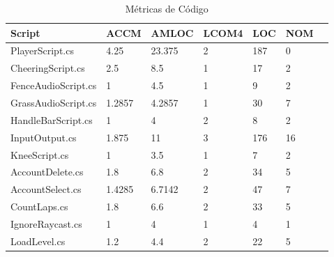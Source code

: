 \begin{table}[htp]
\centering
\caption{Métricas de Código}
\label{figura:metricas}
\begin{tabular}{lllllll}
\hline
Script & ACCM & AMLOC & LCOM4 & LOC & NOM \\
\hline
PlayerScript.cs & 4.25\cellcolor[HTML]{9AFF99} & 23.375\cellcolor[HTML]{FFCE93} & 2\cellcolor[HTML]{FFFC9E} & 187\cellcolor[HTML]{FFCE93} & 0\cellcolor[HTML]{9AFF99} \\
CheeringScript.cs & 2.5\cellcolor[HTML]{9AFF99} & 8.5\cellcolor[HTML]{9AFF99} & 1\cellcolor[HTML]{9AFF99} & 17\cellcolor[HTML]{9AFF99} & 2\cellcolor[HTML]{9AFF99} \\
FenceAudioScript.cs & 1\cellcolor[HTML]{9AFF99} & 4.5\cellcolor[HTML]{9AFF99} & 1\cellcolor[HTML]{9AFF99} & 9\cellcolor[HTML]{9AFF99} & 2\cellcolor[HTML]{9AFF99} \\
GrassAudioScript.cs & 1.2857\cellcolor[HTML]{9AFF99} & 4.2857\cellcolor[HTML]{9AFF99} & 1\cellcolor[HTML]{9AFF99} & 30\cellcolor[HTML]{9AFF99} & 7\cellcolor[HTML]{9AFF99} \\
HandleBarScript.cs & 1\cellcolor[HTML]{9AFF99} & 4\cellcolor[HTML]{9AFF99} & 2\cellcolor[HTML]{FFFC9E} & 8\cellcolor[HTML]{9AFF99} & 2\cellcolor[HTML]{9AFF99} \\
InputOutput.cs & 1.875\cellcolor[HTML]{9AFF99} & 11\cellcolor[HTML]{FFFC9E} & 3\cellcolor[HTML]{FFFC9E} & 176\cellcolor[HTML]{FFCE93} & 16\cellcolor[HTML]{FFFC9E} \\
KneeScript.cs & 1\cellcolor[HTML]{9AFF99} & 3.5\cellcolor[HTML]{9AFF99} & 1\cellcolor[HTML]{9AFF99} & 7\cellcolor[HTML]{9AFF99} & 2\cellcolor[HTML]{9AFF99} \\
AccountDelete.cs & 1.8\cellcolor[HTML]{9AFF99} & 6.8\cellcolor[HTML]{9AFF99} & 2\cellcolor[HTML]{FFFC9E} & 34\cellcolor[HTML]{9AFF99} & 5\cellcolor[HTML]{9AFF99} \\
AccountSelect.cs & 1.4285\cellcolor[HTML]{9AFF99} & 6.7142\cellcolor[HTML]{9AFF99} & 2\cellcolor[HTML]{FFFC9E} & 47\cellcolor[HTML]{9AFF99} & 7\cellcolor[HTML]{9AFF99} \\
CountLaps.cs & 1.8\cellcolor[HTML]{9AFF99} & 6.6\cellcolor[HTML]{9AFF99} & 2\cellcolor[HTML]{FFFC9E} & 33\cellcolor[HTML]{9AFF99} & 5\cellcolor[HTML]{9AFF99} \\
IgnoreRaycast.cs & 1\cellcolor[HTML]{9AFF99} & 4\cellcolor[HTML]{9AFF99} & 1\cellcolor[HTML]{9AFF99} & 4\cellcolor[HTML]{9AFF99} & 1\cellcolor[HTML]{9AFF99} \\
LoadLevel.cs & 1.2\cellcolor[HTML]{9AFF99} & 4.4\cellcolor[HTML]{9AFF99} & 2\cellcolor[HTML]{FFFC9E} & 22\cellcolor[HTML]{9AFF99} & 5\cellcolor[HTML]{9AFF99} \\

\end{tabular}
\end{table}
